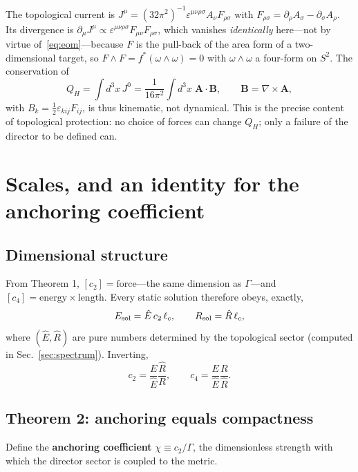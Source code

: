 \documentclass[aps,prd,preprint,nofootinbib,longbibliography]{revtex4-2}
\newcommand{\Av}{\bm{A}}
\newcommand{\Bv}{\bm{B}}
\newcommand{\Qh}{Q_H}
\newcommand{\lc}{\ell_c}
\newcommand{\Ehat}{\hat{E}}
\newcommand{\Rhat}{\hat{R}}
\begin{document}
The topological current is
$J^\mu=(32\pi^2)^{-1}\varepsilon^{\mu\nu\rho\sigma}A_\nu F_{\rho\sigma}$ with
$F_{\rho\sigma}=\partial_\rho A_\sigma-\partial_\sigma A_\rho$. Its divergence is
$\partial_\mu J^\mu\propto\varepsilon^{\mu\nu\rho\sigma}F_{\mu\nu}F_{\rho\sigma}$,
which vanishes \emph{identically} here---not by virtue of~\eqref{eq:eom}---because
$F$ is the pull-back of the area form of a two-dimensional target, so
$F\wedge F=f^*(\omega\wedge\omega)=0$ with $\omega\wedge\omega$ a four-form on
$S^2$. The conservation of
\begin{equation}
\Qh=\int\! d^3x\,J^0=\frac{1}{16\pi^2}\int\! d^3x\;\Av\cdot\Bv,
\qquad \Bv=\nabla\times\Av,
\label{eq:hopf}
\end{equation}
with $B_k=\tfrac12\varepsilon_{kij}F_{ij}$, is thus kinematic, not dynamical.
This is the precise content of topological protection: no choice of forces can
change $\Qh$; only a failure of the director to be defined can.

\section{Scales, and an identity for the anchoring coefficient}
\label{sec:anchoring}

\subsection{Dimensional structure}

From Theorem 1, $[c_2]=\text{force}$---the same dimension as $\Gamma$---and
$[c_4]=\text{energy}\times\text{length}$. Every static solution therefore obeys,
exactly,
\begin{equation}
E_{\rm sol}=\Ehat\,c_2\,\lc,\qquad R_{\rm sol}=\Rhat\,\lc,
\label{eq:shape}
\end{equation}
where $(\Ehat,\Rhat)$ are pure numbers determined by the topological sector
(computed in Sec.~\ref{sec:spectrum}). Inverting,
\begin{equation}
c_2=\frac{E}{\Ehat}\frac{\Rhat}{R},\qquad
c_4=\frac{E}{\Ehat}\frac{R}{\Rhat}.
\label{eq:invert}
\end{equation}

\subsection{Theorem 2: anchoring equals compactness}

Define the \textbf{anchoring coefficient} $\chi\equiv c_2/\Gamma$, the
dimensionless strength with which the director sector is coupled to the metric.
\end{document}
